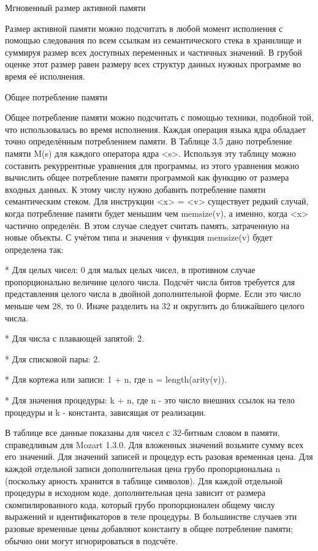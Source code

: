 Мгновенный размер активной памяти

Размер активной памяти можно подсчитать в любой момент исполнения с помощью следования по всем ссылкам из семантического стека в хранилище и суммируя размер всех доступных переменных и частичных значений. В грубой оценке этот размер равен размеру всех структур данных нужных программе во время её исполнения.

Общее потребление памяти

Общее потребление памяти можно подсчитать с помощью техники, подобной той, что использовалась во время исполнения. Каждая операция языка ядра обладает точно определённым потреблением памяти. В Таблице 3.5 дано потребление памяти M(s) для каждого оператора ядра <s>. Используя эту таблицу можно составить рекуррентные уравнения для программы, из этого уравнения можно вычислить общее потребление памяти программой как функцию от размера входных данных. К этому числу нужно добавить потребление памяти семантическим стеком. Для инструкции <x> = <v> существует редкий случай, когда потребление памяти будет меньшим чем memsize(v), а именно, когда <x> частично определён. В этом случае следует считать память, затраченную на новые объекты. С учётом типа и значения v функция memsize(v) будет определена так:

* Для целых чисел: 0 для малых целых чисел, в противном случае пропорционально величине целого числа. Подсчёт числа битов требуется для представления целого числа в двойной дополнительной форме. Если это число меньше чем 28, то 0. Иначе разделить на 32 и округлить до ближайшего целого числа.

* Для числа с плавающей запятой: 2.

* Для списковой пары: 2.

* Для кортежа или записи: 1 + n, где n = length(arity(v)).

* Для значения процедуры: k + n, где n - это число внешних ссылок на тело процедуры и k - константа, зависящая от реализации.

В таблице все данные показаны для чисел с 32-битным словом в памяти, справедливым для Mozart 1.3.0. Для вложенных значений возьмите сумму всех его значений. Для значений записей и процедур есть разовая временная цена. Для каждой отдельной записи дополнительная цена грубо пропорциональна n (поскольку арность хранится в таблице символов). Для каждой отдельной процедуры в исходном коде, дополнительная цена зависит от размера скомпилированного кода, который грубо пропорционален общему числу выражений и идентификаторов в теле процедуры. В большинстве случаев эти разовые временные цены добавляют константу в общее потребление памяти; обычно они могут игнорироваться в подсчёте.

